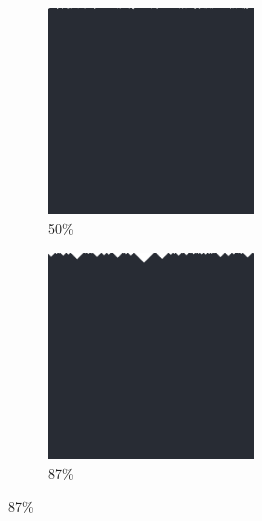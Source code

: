 \documentclass[12pt, fleqn]{report}                             %
\theoremstyle{break}                                            %
\begin{document}
\begin{figure}[ht!]
\begin{subfigure}[b]{0.4\linewidth}
          \includegraphics[width=0.6\textwidth]{Images/128/c.png}
          \caption{50\%}
        \end{subfigure}
        \begin{subfigure}[b]{0.4\linewidth}
          \includegraphics[width=0.6\textwidth]{Images/128/d.png}
          \caption{87\%}
        \end{subfigure}
      \end{figure}
\end{document}
